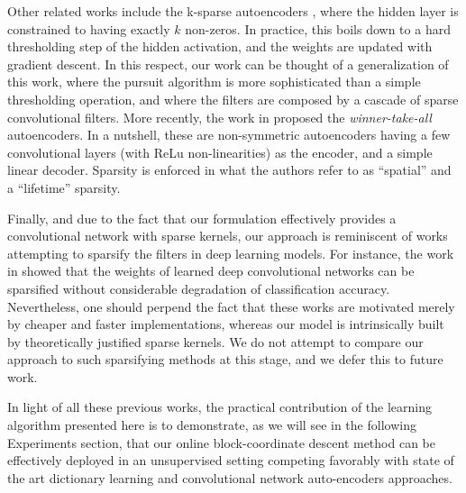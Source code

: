 \documentclass[10pt,journal]{IEEEtran}
\def\x{{\mathbf x}}
\def\y{{\mathbf y}}
\def\D{{\mathbf D}}
\def\M{{\mathcal{M}}}
\def\gama{{\boldsymbol \gamma}}
\theoremstyle{plain}
\theoremstyle{definition}
\begin{document}
Other related works include the k-sparse autoencoders \cite{makhzani2013k}, where the hidden layer is constrained to having exactly $k$ non-zeros. In practice, this boils down to a hard thresholding step of the hidden activation, and the weights are updated with gradient descent. In this respect, our work can be thought of a generalization of this work, where the pursuit algorithm is more sophisticated than a simple thresholding operation, and where the filters are composed by a cascade of sparse convolutional filters. 
More recently, the work in \cite{makhzani2015winner} proposed the \emph{winner-take-all} autoencoders. In a nutshell, these are non-symmetric autoencoders having a few convolutional layers (with ReLu non-linearities) as the encoder, and a simple linear decoder. Sparsity is enforced in what the authors refer to as ``spatial'' and a ``lifetime'' sparsity. 

Finally, and due to the fact that our formulation effectively provides a convolutional network with sparse kernels, our approach is reminiscent of works attempting to sparsify the filters in deep learning models. For instance, the work in \cite{liu2015sparse} showed that the weights of learned deep convolutional networks can be sparsified without considerable degradation of classification accuracy. Nevertheless, one should perpend the fact that these works are motivated merely by cheaper and faster implementations, whereas our model is intrinsically built by theoretically justified sparse kernels. We do not attempt to compare our approach to such sparsifying methods at this stage, and we defer this to future work.

In light of all these previous works, the practical contribution of the learning algorithm presented here is to demonstrate, as we will see in the following Experiments section, that our online block-coordinate descent method can be effectively deployed in an unsupervised setting competing favorably with state of the art dictionary learning and convolutional network auto-encoders approaches. 



 
\end{document}
